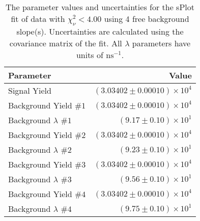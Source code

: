 
\begin{table}
    \begin{center}
        \begin{tabular}{lr}\toprule
            Parameter & Value \\\midrule
            Signal Yield & $(3.03402 \pm 0.00010) \times 10^{4}$ \\
            Background Yield $\#1$ & $(3.03402 \pm 0.00010) \times 10^{4}$ \\
            Background $\lambda$ $\#1$ & $(9.17 \pm 0.10) \times 10^{1}$ \\
            Background Yield $\#2$ & $(3.03402 \pm 0.00010) \times 10^{4}$ \\
            Background $\lambda$ $\#2$ & $(9.23 \pm 0.10) \times 10^{1}$ \\
            Background Yield $\#3$ & $(3.03402 \pm 0.00010) \times 10^{4}$ \\
            Background $\lambda$ $\#3$ & $(9.56 \pm 0.10) \times 10^{1}$ \\
            Background Yield $\#4$ & $(3.03402 \pm 0.00010) \times 10^{4}$ \\
            Background $\lambda$ $\#4$ & $(9.75 \pm 0.10) \times 10^{1}$ \\\bottomrule
        \end{tabular}
        \caption{The parameter values and uncertainties for the sPlot fit of data with $\chi^2_\nu < 4.00$ using 4 free background slope(s). Uncertainties are calculated using the covariance matrix of the fit. All $\lambda$ parameters have units of $\si{\nano\second}^{-1}$.}
    \end{center}
\end{table}
